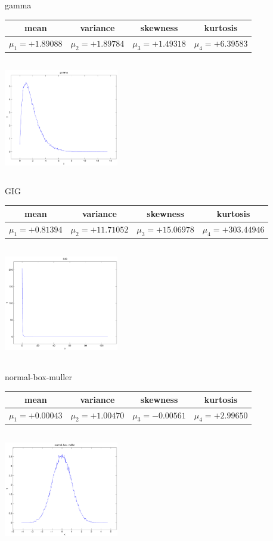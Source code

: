 \documentclass[9pt]{article}
\theoremstyle{plain}
\theoremstyle{definition}
\theoremstyle{remark}
\numberwithin{equation}{section}
\begin{document}
\newpage
gamma \begin{tabular}{|c|c|c|c|}  mean & variance & skewness & kurtosis \\  \hline
$\mu_1 = +1.89088$ & $\mu_2 = +1.89784$ & $\mu_3 = +1.49318$ & $\mu_4 =+6.39583$ \\
\end{tabular}

\includegraphics[width=5cm,height=5cm]{gamma.pdf}

GIG \begin{tabular}{|c|c|c|c|}  mean & variance & skewness & kurtosis \\  \hline
$\mu_1 = +0.81394$ & $\mu_2 = +11.71052$ & $\mu_3 = +15.06978$ & $\mu_4 =+303.44946$ \\
\end{tabular}

\includegraphics[width=5cm,height=5cm]{GIG.pdf}

normal-box-muller \begin{tabular}{|c|c|c|c|}  mean & variance & skewness & kurtosis \\  \hline
$\mu_1 = +0.00043$ & $\mu_2 = +1.00470$ & $\mu_3 = -0.00561$ & $\mu_4 =+2.99650$ \\
\end{tabular}

\includegraphics[width=5cm,height=5cm]{normal-box-muller.pdf}
\end{document}
